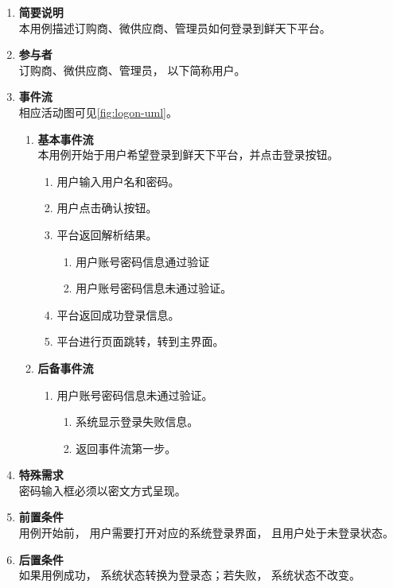 \begin{enumerate}
	\item \textbf{简要说明}  \\ 本用例描述订购商、微供应商、管理员如何登录到鲜天下平台。
	\item \textbf{参与者} \\ 订购商、微供应商、管理员， 以下简称用户。
	\item \textbf{事件流} \\ 相应活动图可见\autoref{fig:logon-uml}。
	\begin{enumerate} 
        \item \textbf{基本事件流} \\ 本用例开始于用户希望登录到鲜天下平台，并点击登录按钮。
        \begin{enumerate}
            \item 用户输入用户名和密码。
            \item 用户点击确认按钮。
            \item 平台返回解析结果。
            \begin{enumerate}
                \item 用户账号密码信息通过验证
                \item 用户账号密码信息未通过验证。
            \end{enumerate}
            \item 平台返回成功登录信息。
            \item 平台进行页面跳转，转到主界面。
        \end{enumerate}
        \item \textbf{后备事件流}
        \begin{enumerate}
            \item 用户账号密码信息未通过验证。
            \begin{enumerate}
                \item 系统显示登录失败信息。
                \item 返回事件流第一步。
            \end{enumerate}

        \end{enumerate}
    \end{enumerate}
    \item \textbf{特殊需求} \\ 密码输入框必须以密文方式呈现。
    \item \textbf{前置条件} \\ 用例开始前， 用户需要打开对应的系统登录界面， 且用户处于未登录状态。
    \item \textbf{后置条件} \\ 如果用例成功， 系统状态转换为登录态；若失败， 系统状态不改变。
\end{enumerate}


